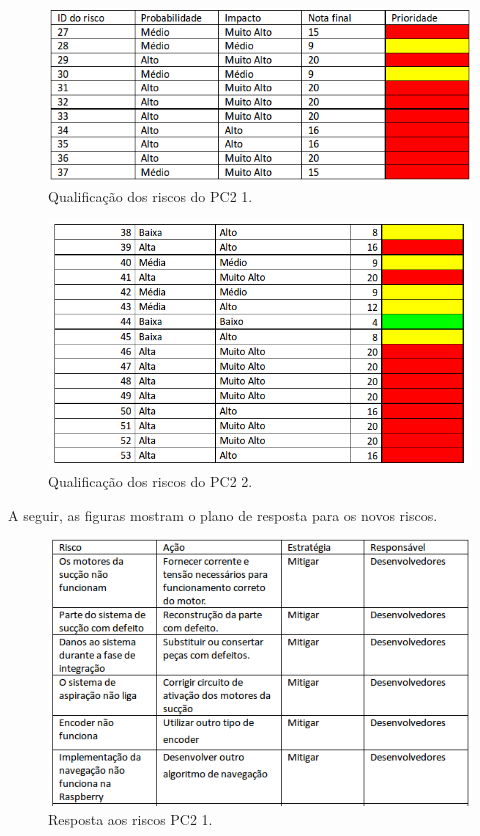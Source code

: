 \begin{figure}[H]
	\centering
	\includegraphics[scale=0.5]{figuras/riscosQualitativopc2.png}
	\caption{Qualificação dos riscos do PC2 1.}
	\label{img:qualitativoriscospc2}
\end{figure}

\begin{figure}[H]
	\centering
	\includegraphics[scale=0.5]{figuras/riscosQualitativopc22.png}
	\caption{Qualificação dos riscos do PC2 2.}
	\label{img:qualitativoriscospc22}
\end{figure}

A seguir, as figuras mostram o plano de resposta para os novos riscos.

\begin{figure}[H]
	\centering
	\includegraphics[scale=0.5]{figuras/riscos_acao_pc2_1.png}
	\caption{Resposta aos riscos PC2 1.}
	\label{img:respostasriscospc21}
\end{figure}

